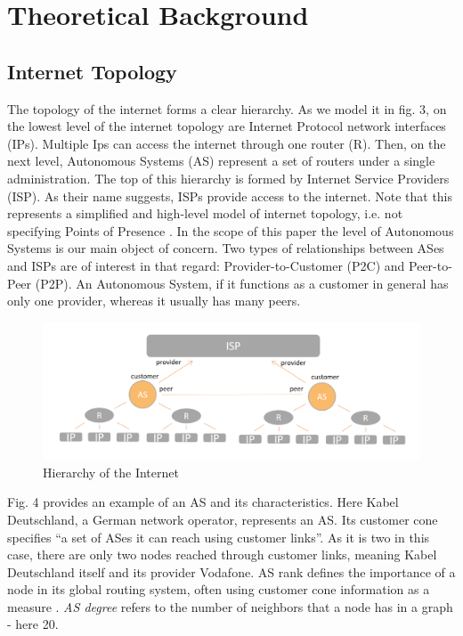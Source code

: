 \documentclass[conference, 11pt]{IEEEtran}
\begin{document}
\section{Theoretical Background} 
\subsection{Internet Topology}

The topology of the internet forms a clear hierarchy. As we model it in fig. 3, on the lowest level of the internet topology are Internet Protocol network interfaces (IPs). Multiple Ips can access the internet through one router (R). Then, on the next level, Autonomous Systems (AS) represent a set of routers under a single administration. The top of this hierarchy is formed by Internet Service Providers (ISP). As their name suggests, ISPs provide access to the internet. Note that this represents a simplified and high-level model of internet topology, i.e. not specifying Points of Presence \cite{ASH}. In the scope of this paper the level of Autonomous Systems is our main object of concern. Two types of relationships between ASes and ISPs are of interest in that regard: Provider-to-Customer (P2C) and Peer-to-Peer (P2P). An Autonomous System, if it functions as a customer in general has only one provider, whereas it usually has many peers. 
 

\begin{figure}[htbp]
\centerline{\includegraphics[scale=0.26]{Graphics/hierarchy.PNG}}
\caption{Hierarchy of the Internet}
\label{fig}
\end{figure}
\vspace{0.5cm}





Fig. 4 provides an example of an AS and its characteristics. Here Kabel Deutschland, a German network operator, represents an AS. Its customer cone specifies  ``a set of ASes it can reach using customer links''\cite{Rank}. As it is two in this case, there are only two nodes reached through customer links, meaning Kabel Deutschland itself and its provider Vodafone\cite{Rank}.  
AS rank defines the importance of a node in its global routing system, often using customer cone information as a measure \cite{Rank}.
\textit{AS degree} refers to the number of neighbors that a node has in a graph - here 20\cite{Cone}.  \\
\end{document}

